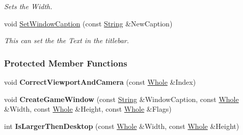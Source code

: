 \begin{DoxyCompactItemize}
\begin{DoxyCompactList}\small\item\em Sets the Width. \item\end{DoxyCompactList}\item 
void \hyperlink{classMezzanine_1_1GameWindow_ab115ae2f4af6e3136208bb6d20433b97}{SetWindowCaption} (const \hyperlink{namespaceMezzanine_acf9fcc130e6ebf08e3d8491aebcf1c86}{String} \&NewCaption)
\begin{DoxyCompactList}\small\item\em This can set the the Text in the titlebar. \item\end{DoxyCompactList}\end{DoxyCompactItemize}
\subsubsection*{Protected Member Functions}
\begin{DoxyCompactItemize}
\item 
\hypertarget{classMezzanine_1_1GameWindow_a3455efef5fb6a145649ecf4eb088f318}{
void {\bfseries CorrectViewportAndCamera} (const \hyperlink{namespaceMezzanine_adcbb6ce6d1eb4379d109e51171e2e493}{Whole} \&Index)}
\label{classMezzanine_1_1GameWindow_a3455efef5fb6a145649ecf4eb088f318}

\item 
\hypertarget{classMezzanine_1_1GameWindow_acc55f88a63f67c381ea51a8918061aa5}{
void {\bfseries CreateGameWindow} (const \hyperlink{namespaceMezzanine_acf9fcc130e6ebf08e3d8491aebcf1c86}{String} \&WindowCaption, const \hyperlink{namespaceMezzanine_adcbb6ce6d1eb4379d109e51171e2e493}{Whole} \&Width, const \hyperlink{namespaceMezzanine_adcbb6ce6d1eb4379d109e51171e2e493}{Whole} \&Height, const \hyperlink{namespaceMezzanine_adcbb6ce6d1eb4379d109e51171e2e493}{Whole} \&Flags)}
\label{classMezzanine_1_1GameWindow_acc55f88a63f67c381ea51a8918061aa5}

\item 
\hypertarget{classMezzanine_1_1GameWindow_ad2c84a47e063186c5f47213153cc3e85}{
int {\bfseries IsLargerThenDesktop} (const \hyperlink{namespaceMezzanine_adcbb6ce6d1eb4379d109e51171e2e493}{Whole} \&Width, const \hyperlink{namespaceMezzanine_adcbb6ce6d1eb4379d109e51171e2e493}{Whole} \&Height)}
\label{classMezzanine_1_1GameWindow_ad2c84a47e063186c5f47213153cc3e85}

\end{DoxyCompactItemize}
